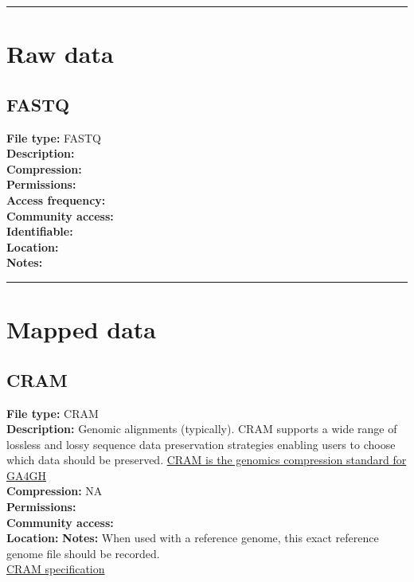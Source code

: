 \documentclass[
  11pt,
]{book}
\begin{document}
\begin{center}\rule{0.5\linewidth}{0.5pt}\end{center}

\hypertarget{raw-data}{%
\section{Raw data}\label{raw-data}}

\hypertarget{fastq}{%
\subsection{FASTQ}\label{fastq}}

\textbf{File type:} FASTQ\\
\textbf{Description:}\\
\textbf{Compression:}\\
\textbf{Permissions:}\\
\textbf{Access frequency:}\\
\textbf{Community access:}\\
\textbf{Identifiable:}\\
\textbf{Location:}\\
\textbf{Notes:}

\begin{center}\rule{0.5\linewidth}{0.5pt}\end{center}

\hypertarget{mapped-data}{%
\section{Mapped data}\label{mapped-data}}

\hypertarget{cram-1}{%
\subsection{CRAM}\label{cram-1}}

\textbf{File type:} CRAM\\
\textbf{Description:} Genomic alignments (typically). CRAM supports a wide
range of lossless and lossy sequence data preservation strategies enabling users to choose which data should be preserved. \href{https://www.ga4gh.org/cram/}{CRAM is the genomics compression standard for GA4GH}\\
\textbf{Compression:} NA\\
\textbf{Permissions:}\\
\textbf{Community access:}\\
\textbf{Location:}
\textbf{Notes:} When used with a reference genome, this exact reference genome file should be recorded.\\
\href{https://samtools.github.io/hts-specs/CRAMv3.pdf}{CRAM specification}
\end{document}
